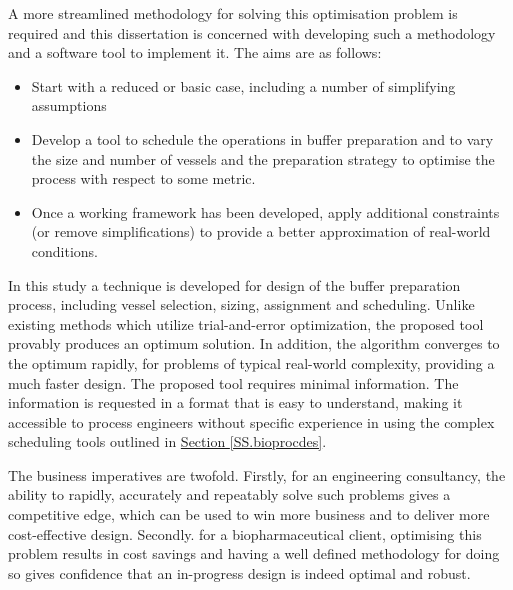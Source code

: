 A more streamlined methodology for solving this optimisation problem is
required and this dissertation is concerned with developing such a methodology
and a software tool to implement it.
The aims are as follows:
\begin{itemize}
    \item Start with a reduced or basic case, including a number of simplifying
        assumptions
    \item Develop a tool to schedule the operations in buffer preparation and
        to vary the size and number of vessels and the preparation strategy to
        optimise the process with respect to some metric.
    \item Once a working framework has been developed, apply additional
        constraints (or remove simplifications) to provide a better
        approximation of real-world conditions.
\end{itemize}

In this study a technique is developed for design of the buffer preparation
process, including vessel selection, sizing, assignment and scheduling.
Unlike existing methods which utilize trial-and-error optimization, the
proposed tool provably produces an optimum solution.
In addition, the algorithm converges to the optimum rapidly, for problems of
typical real-world complexity, providing a much faster design.
The proposed tool requires minimal information.
The information is requested in a format that is easy to understand, making it
accessible to process engineers without specific experience in using the
complex scheduling tools outlined in
\hyperref[SS.bioprocdes]{Section \ref*{SS.bioprocdes}}.

The business imperatives are twofold.
Firstly, for an engineering consultancy, the ability to rapidly, accurately and
repeatably solve such problems gives a competitive edge, which can be used to
win more business and to deliver more cost-effective design.
Secondly. for a biopharmaceutical client, optimising this problem results in
cost savings and having a well defined methodology for doing so gives
confidence that an in-progress design is indeed optimal and robust.

